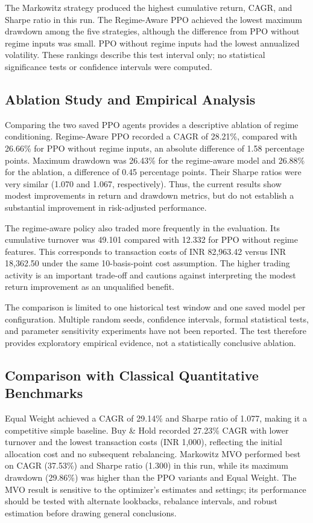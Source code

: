 \documentclass[conference]{IEEEtran}
\begin{document}
The Markowitz strategy produced the highest cumulative return, CAGR, and Sharpe ratio in this run. The Regime-Aware PPO achieved the lowest maximum drawdown among the five strategies, although the difference from PPO without regime inputs was small. PPO without regime inputs had the lowest annualized volatility. These rankings describe this test interval only; no statistical significance tests or confidence intervals were computed.

\subsection{Ablation Study and Empirical Analysis}
Comparing the two saved PPO agents provides a descriptive ablation of regime conditioning. Regime-Aware PPO recorded a CAGR of 28.21\%, compared with 26.66\% for PPO without regime inputs, an absolute difference of 1.58 percentage points. Maximum drawdown was 26.43\% for the regime-aware model and 26.88\% for the ablation, a difference of 0.45 percentage points. Their Sharpe ratios were very similar (1.070 and 1.067, respectively). Thus, the current results show modest improvements in return and drawdown metrics, but do not establish a substantial improvement in risk-adjusted performance.

The regime-aware policy also traded more frequently in the evaluation. Its cumulative turnover was 49.101 compared with 12.332 for PPO without regime features. This corresponds to transaction costs of INR 82,963.42 versus INR 18,362.50 under the same 10-basis-point cost assumption. The higher trading activity is an important trade-off and cautions against interpreting the modest return improvement as an unqualified benefit.

The comparison is limited to one historical test window and one saved model per configuration. Multiple random seeds, confidence intervals, formal statistical tests, and parameter sensitivity experiments have not been reported. The test therefore provides exploratory empirical evidence, not a statistically conclusive ablation.

\subsection{Comparison with Classical Quantitative Benchmarks}
Equal Weight achieved a CAGR of 29.14\% and Sharpe ratio of 1.077, making it a competitive simple baseline. Buy \& Hold recorded 27.23\% CAGR with lower turnover and the lowest transaction costs (INR 1,000), reflecting the initial allocation cost and no subsequent rebalancing. Markowitz MVO performed best on CAGR (37.53\%) and Sharpe ratio (1.300) in this run, while its maximum drawdown (29.86\%) was higher than the PPO variants and Equal Weight. The MVO result is sensitive to the optimizer's estimates and settings; its performance should be tested with alternate lookbacks, rebalance intervals, and robust estimation before drawing general conclusions.
\end{document}
